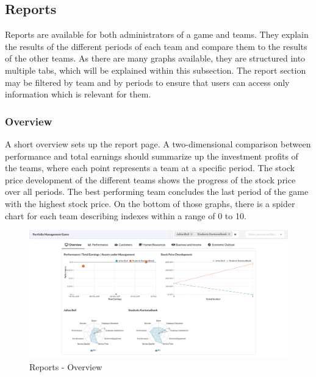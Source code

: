 \subsection{Reports}
\label{subsec:reports}
Reports are available for both administrators of a game and teams. They explain the results of the different periods of each team and compare them to the results of the other teams. As there are many graphs available, they are structured into multiple tabs, which will be explained within this subsection. The report section may be filtered by team and by periods to ensure that users can access only information which is relevant for them.

\subsubsection{Overview}
A short overview sets up the report page. A two-dimensional comparison between performance and total earnings should summarize up the investment profits of the teams, where each point represents a team at a specific period. The stock price development of the different teams shows the progress of the stock price over all periods. The best performing team concludes the last period of the game with the highest stock price. On the bottom of those graphs, there is a spider chart for each team describing indexes within a range of 0 to 10.
\begin{figure}[h!]
  \centering
  \includegraphics[scale=0.2]{img/application-overview/reports/01_overview.png}
  \caption{Reports - Overview}
\end{figure}

